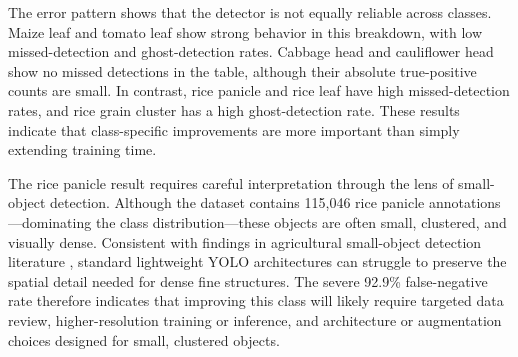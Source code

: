 \begin{table}[H]
  \centering
  \caption{Error analysis breakdown by YOLO class}
  \label{tab:yolo-error-analysis}
  \small
\end{table}

The error pattern shows that the detector is not equally reliable across classes. Maize leaf and
tomato leaf show strong behavior in this breakdown, with low missed-detection and ghost-detection
rates. Cabbage head and cauliflower head show no missed detections in the table, although their
absolute true-positive counts are small. In contrast, rice panicle and rice leaf have high
missed-detection rates, and rice grain cluster has a high ghost-detection rate. These results
indicate that class-specific improvements are more important than simply extending training time.

The rice panicle result requires careful interpretation through the lens of small-object
detection. Although the dataset contains 115,046 rice panicle annotations---dominating the class
distribution---these objects are often small, clustered, and visually dense. Consistent with
findings in agricultural small-object detection literature \parencite{zhengSmallObjDetAgri2023},
standard lightweight YOLO architectures can struggle to preserve the spatial detail needed for
dense fine structures. The severe 92.9\% false-negative rate therefore indicates that improving
this class will likely require targeted data review, higher-resolution training or inference, and
architecture or augmentation choices designed for small, clustered objects.


